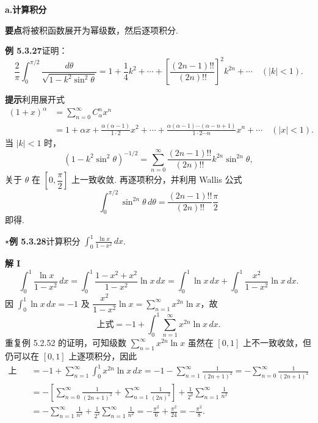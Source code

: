 \documentclass[UTF8, 12pt, fontset=fandol, oneside]{ctexart}
\begin{document}
\noindent\textbf{a.\quad 计算积分}

\noindent\textbf{要点}\quad 将被积函数展开为幂级数，然后逐项积分.

\noindent\textbf{例 5.3.27}\quad 证明：
\[
  \frac2\pi\int_0^{\pi/2}\frac{d\theta}{\sqrt{1-k^2\sin^2\theta}}
  =1+\frac14k^2+\cdots+
  \left[\frac{(2n-1)!!}{(2n)!!}\right]^2k^{2n}+\cdots\quad(|k|<1).
\]

\noindent\textbf{提示}\quad 利用展开式
\[
\begin{aligned}
(1+x)^\alpha
&=\sum_{n=0}^{\infty}C_\alpha^nx^n\\
&=1+\alpha x+\frac{\alpha(\alpha-1)}{1\cdot2}x^2+\cdots
+\frac{\alpha(\alpha-1)\cdots(\alpha-n+1)}{1\cdot2\cdots n}x^n+\cdots\quad(|x|<1).
\end{aligned}
\]
当 $|k|<1$ 时，
\[
  (1-k^2\sin^2\theta)^{-1/2}
  =\sum_{n=0}^{\infty}\frac{(2n-1)!!}{(2n)!!}k^{2n}\sin^{2n}\theta,
\]
关于 $\theta$ 在 $\left[0,\dfrac\pi2\right]$ 上一致收敛. 再逐项积分，并利用 Wallis 公式
\[
  \int_0^{\pi/2}\sin^{2n}\theta\,d\theta
  =\frac{(2n-1)!!}{(2n)!!}\frac\pi2
\]
即得.

\noindent\(\star\)\textbf{例 5.3.28}\quad 计算积分
$\displaystyle\int_0^1\frac{\ln x}{1-x^2}\,dx$.

\noindent\textbf{解 I}\quad
\[
  \int_0^1\frac{\ln x}{1-x^2}\,dx
  =\int_0^1\frac{1-x^2+x^2}{1-x^2}\ln x\,dx
  =\int_0^1\ln x\,dx+\int_0^1\frac{x^2}{1-x^2}\ln x\,dx.
\]
因 $\displaystyle\int_0^1\ln x\,dx=-1$ 及
$\dfrac{x^2}{1-x^2}\ln x=\displaystyle\sum_{n=1}^{\infty}x^{2n}\ln x$，故
\[
  \text{上式}=-1+\int_0^1\sum_{n=1}^{\infty}x^{2n}\ln x\,dx.
\]
重复例 5.2.52 的证明，可知级数 $\displaystyle\sum_{n=1}^{\infty}x^{2n}\ln x$ 虽然在 $[0,1]$ 上不一致收敛，但仍可以在 $[0,1]$ 上逐项积分，因此
\[
\begin{aligned}
\text{上式}
&=-1+\sum_{n=1}^{\infty}\int_0^1x^{2n}\ln x\,dx
=-1-\sum_{n=1}^{\infty}\frac1{(2n+1)^2}
=-\sum_{n=0}^{\infty}\frac1{(2n+1)^2}\\
&=-\left[\sum_{n=0}^{\infty}\frac1{(2n+1)^2}
+\sum_{n=1}^{\infty}\frac1{(2n)^2}\right]
+\frac1{2^2}\sum_{n=1}^{\infty}\frac1{n^2}\\
&=-\sum_{n=1}^{\infty}\frac1{n^2}
+\frac1{2^2}\sum_{n=1}^{\infty}\frac1{n^2}
=-\frac{\pi^2}{6}+\frac{\pi^2}{24}
=-\frac{\pi^2}{8}.
\end{aligned}
\]
\end{document}
